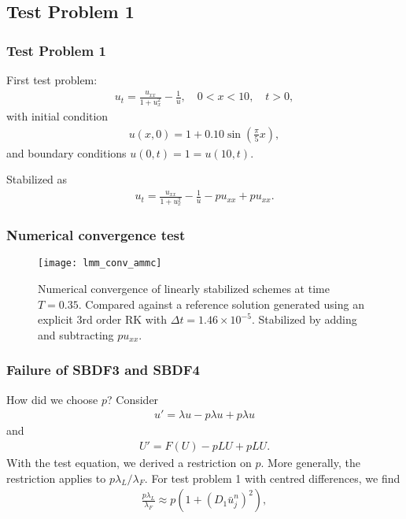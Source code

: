 \documentclass[hyperref={pdfpagelabels=false}]{beamer}
\begin{document}
\subsection{Test Problem 1} 
\begin{frame}
	\frametitle{Test Problem 1} 
First test problem: 
	\begin{align*}
		u_t = \frac{u_{xx}}{1 + u_x^2} - \frac{1}{u}, 
		\quad 0 < x < 10,\quad t > 0, 
	\end{align*}
with initial condition 
	\begin{align*}
		u(x,0) = 1 + 0.10\sin\left(\frac{\pi}{5}x \right),
	\end{align*}
and boundary conditions $u(0,t) = 1 = u(10,t)$.

Stabilized as 
\begin{align*}
u_t = \frac{u_{xx}}{1 + u_x^2} - \frac{1}{u} - pu_{xx} + pu_{xx}.
\end{align*}
\end{frame}

\begin{frame}
	\frametitle{Numerical convergence test}
	\begin{figure}[t]
		\centering
		\texttt{[image: lmm\_conv\_ammc]}
		\caption{Numerical convergence of linearly stabilized schemes at time $T=0.35$. Compared against a reference solution generated using an explicit 3rd order RK with $\Delta t = 1.46\times 10^{-5}$. Stabilized by adding and subtracting $pu_{xx}$.}
	\end{figure}
\end{frame}

\begin{frame}
	\frametitle{Failure of SBDF3 and SBDF4}
How did we choose $p$? Consider 
	\begin{align*}
		u' = \lambda u - p\lambda u + p\lambda u
	\end{align*}
and 
	\begin{align*}
		U' = F(U) - pLU + pLU.
	\end{align*}
With the test equation, we derived a restriction on $p$. More generally, the restriction applies to $p\lambda_L / \lambda_F$. For test problem 1 with centred differences, we find 
	\begin{align*}
		\frac{p\lambda_L}{\lambda_F} 
		\approx p(1 + (D_1 \bar u^n_j)^2), 
	\end{align*}
\end{frame}
\end{document}
